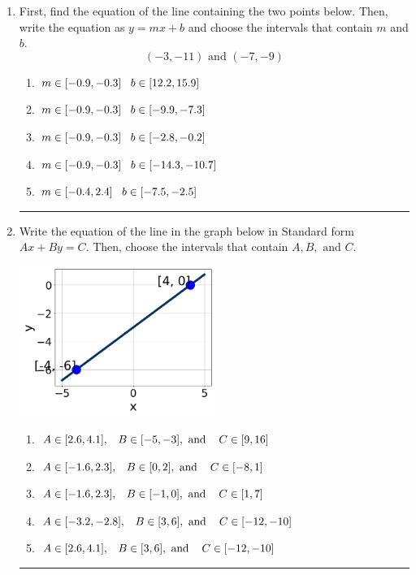 \documentclass[14pt]{extbook}
\newcommand{\litem}[1]{\item#1\hspace*{-1cm}\rule{\textwidth}{0.4pt}}
\begin{document}
\begin{enumerate}
{\begin{enumerate}[label=\Alph*.]
\end{enumerate} }
\litem{
First, find the equation of the line containing the two points below. Then, write the equation as $ y=mx+b $ and choose the intervals that contain $m$ and $b$.\[ (-3, -11) \text{ and } (-7, -9) \]\begin{enumerate}[label=\Alph*.]
\item \( m \in [-0.9, -0.3] \hspace*{3mm} b \in [12.2, 15.9] \)
\item \( m \in [-0.9, -0.3] \hspace*{3mm} b \in [-9.9, -7.3] \)
\item \( m \in [-0.9, -0.3] \hspace*{3mm} b \in [-2.8, -0.2] \)
\item \( m \in [-0.9, -0.3] \hspace*{3mm} b \in [-14.3, -10.7] \)
\item \( m \in [-0.4, 2.4] \hspace*{3mm} b \in [-7.5, -2.5] \)

\end{enumerate} }
\litem{
Write the equation of the line in the graph below in Standard form $Ax+By=C$. Then, choose the intervals that contain $A, B, \text{ and } C$.
\begin{center}
    \includegraphics[width=0.5\textwidth]{../Figures/linearGraphToStandardCopyA.png}
\end{center}
\begin{enumerate}[label=\Alph*.]
\item \( A \in [2.6, 4.1], \hspace{3mm} B \in [-5, -3], \text{ and } \hspace{3mm} C \in [9, 16] \)
\item \( A \in [-1.6, 2.3], \hspace{3mm} B \in [0, 2], \text{ and } \hspace{3mm} C \in [-8, 1] \)
\item \( A \in [-1.6, 2.3], \hspace{3mm} B \in [-1, 0], \text{ and } \hspace{3mm} C \in [1, 7] \)
\item \( A \in [-3.2, -2.8], \hspace{3mm} B \in [3, 6], \text{ and } \hspace{3mm} C \in [-12, -10] \)
\item \( A \in [2.6, 4.1], \hspace{3mm} B \in [3, 6], \text{ and } \hspace{3mm} C \in [-12, -10] \)

\end{enumerate} }
\end{enumerate}
\end{document}
